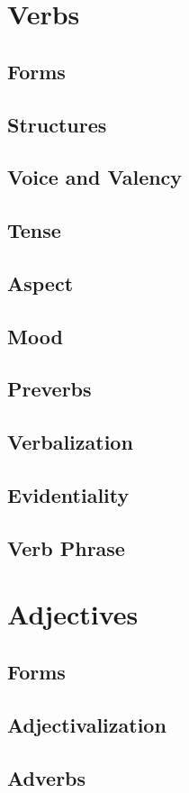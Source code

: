 \documentclass{article}
\begin{document}
\chapter{Verbs}
	\section{Forms}
	\section{Structures}
	\section{Voice and Valency}
	\section{Tense}
	\section{Aspect}
	\section{Mood}
	\section{Preverbs}
	\section{Verbalization}
	\section{Evidentiality}
	\section{Verb Phrase}
	
\chapter{Adjectives}
	\section{Forms}
	\section{Adjectivalization}
	\section{Adverbs}
\end{document}
